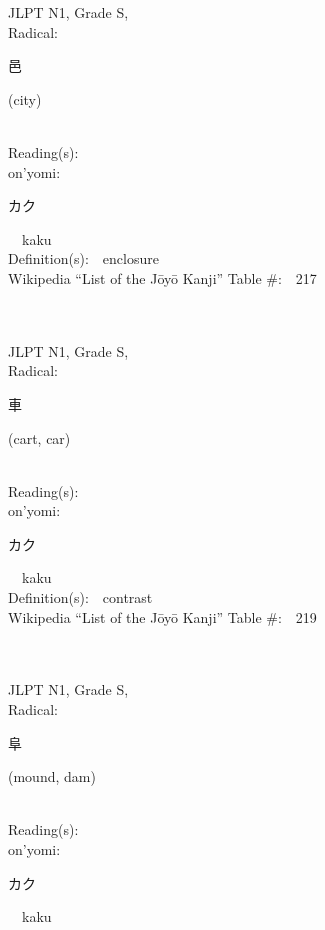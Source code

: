 \begin{multicols}{2}
{JLPT N1, Grade S, \\Radical:\ \ {\begin{CJK}{UTF8}{min} 邑 \end{CJK}} (city) } \\
Reading(s):\ \ \\
{\hspace*{1em}}on'yomi:\ \ \\
{\hspace*{2em}}{\begin{CJK}{UTF8}{min} カク \end{CJK}}\ \ kaku\ \ \\
Definition(s):\ \ enclosure \\
Wikipedia ``List of the J\=oy\=o Kanji'' Table \#:\ \ 217 \\
\ \ \\
{\fontsize{34pt}{40pt}  }\ \ \\
{JLPT N1, Grade S, \\Radical:\ \ {\begin{CJK}{UTF8}{min} 車 \end{CJK}} (cart, car) } \\
Reading(s):\ \ \\
{\hspace*{1em}}on'yomi:\ \ \\
{\hspace*{2em}}{\begin{CJK}{UTF8}{min} カク \end{CJK}}\ \ kaku\ \ \\
Definition(s):\ \ contrast \\
Wikipedia ``List of the J\=oy\=o Kanji'' Table \#:\ \ 219 \\
\ \ \\
{\fontsize{34pt}{40pt}  }\ \ \\
{JLPT N1, Grade S, \\Radical:\ \ {\begin{CJK}{UTF8}{min} 阜 \end{CJK}} (mound, dam) } \\
Reading(s):\ \ \\
{\hspace*{1em}}on'yomi:\ \ \\
{\hspace*{2em}}{\begin{CJK}{UTF8}{min} カク \end{CJK}}\ \ kaku\ \ \\

\end{multicols}
